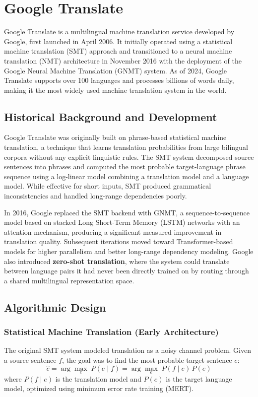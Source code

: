 \documentclass[11pt,a4paper]{report}
\begin{document}

\section{Google Translate}
Google Translate is a multilingual machine translation service developed by Google, first launched in April 2006.
It initially operated using a statistical machine translation (SMT) approach and transitioned to a neural machine
translation (NMT) architecture in November 2016 with the deployment of the Google Neural Machine Translation
(GNMT) system. As of 2024, Google Translate supports over 100 languages and processes billions of words daily,
making it the most widely used machine translation system in the world.

\subsection{Historical Background and Development}
Google Translate was originally built on phrase-based statistical machine translation, a technique that learns
translation probabilities from large bilingual corpora without any explicit linguistic rules. The SMT system
decomposed source sentences into phrases and computed the most probable target-language phrase sequence using a
log-linear model combining a translation model and a language model. While effective for short inputs, SMT
produced grammatical inconsistencies and handled long-range dependencies poorly.

In 2016, Google replaced the SMT backend with GNMT, a sequence-to-sequence model based on stacked Long Short-Term
Memory (LSTM) networks with an attention mechanism, producing a significant measured improvement in translation
quality. Subsequent iterations moved toward Transformer-based models for higher parallelism and better
long-range dependency modeling. Google also introduced \textbf{zero-shot translation}, where the system could
translate between language pairs it had never been directly trained on by routing through a shared multilingual
representation space.

\subsection{Algorithmic Design}

\subsubsection{Statistical Machine Translation (Early Architecture)}
The original SMT system modeled translation as a noisy channel problem. Given a source sentence $f$, the goal
was to find the most probable target sentence $e$:
\[
\hat{e} = \arg\max_{e}\; P(e \mid f) = \arg\max_{e}\; P(f \mid e)\, P(e)
\]
where $P(f \mid e)$ is the translation model and $P(e)$ is the target language model, optimized using minimum
error rate training (MERT).
\end{document}
